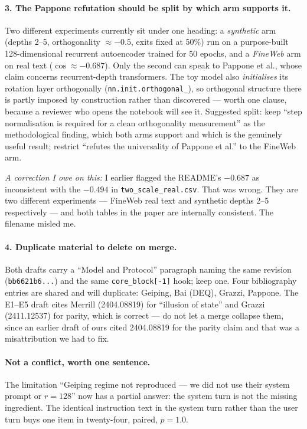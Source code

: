 \documentclass[11pt,a4paper]{article}
\begin{document}
\paragraph{3. The Pappone refutation should be split by which arm supports it.}
Two different experiments currently sit under one heading: a \emph{synthetic} arm (depths 2--5,
orthogonality $\approx -0.5$, exits fixed at 50\%) run on a purpose-built 128-dimensional recurrent
autoencoder trained for 50 epochs, and a \emph{FineWeb} arm on real text ($\cos \approx -0.687$).
Only the second can speak to Pappone et al., whose claim concerns recurrent-depth transformers. The
toy model also \emph{initialises} its rotation layer orthogonally
(\texttt{nn.init.orthogonal\_}), so orthogonal structure there is partly imposed by construction
rather than discovered --- worth one clause, because a reviewer who opens the notebook will see it.
Suggested split: keep ``step normalisation is required for a clean orthogonality measurement'' as
the methodological finding, which both arms support and which is the genuinely useful result;
restrict ``refutes the universality of Pappone et al.'' to the FineWeb arm.

\emph{A correction I owe on this:} I earlier flagged the README's $-0.687$ as inconsistent with the
$-0.494$ in \texttt{two\_scale\_real.csv}. That was wrong. They are two different experiments ---
FineWeb real text and synthetic depths 2--5 respectively --- and both tables in the paper are
internally consistent. The filename misled me.

\paragraph{4. Duplicate material to delete on merge.}
Both drafts carry a ``Model and Protocol'' paragraph naming the same revision
(\texttt{bb6621b6...}) and the same \texttt{core\_block[-1]} hook; keep one. Four bibliography
entries are shared and will duplicate: Geiping, Bai (DEQ), Grazzi, Pappone. The E1--E5 draft cites
Merrill (2404.08819) for ``illusion of state'' and Grazzi (2411.12537) for parity, which is
correct --- do not let a merge collapse them, since an earlier draft of ours cited 2404.08819 for
the parity claim and that was a misattribution we had to fix.

\paragraph{Not a conflict, worth one sentence.} The limitation ``Geiping regime not reproduced ---
we did not use their system prompt or $r=128$'' now has a partial answer: the system turn is not
the missing ingredient. The identical instruction text in the system turn rather than the user turn
buys one item in twenty-four, paired, $p = 1.0$.
\end{document}
